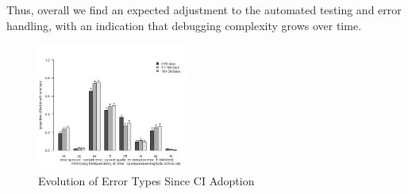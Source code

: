 Thus, overall we find an expected adjustment to the automated testing and 
error handling, with an indication that debugging complexity grows over time.



\begin{figure}[!t]
	\centering
	\includegraphics[width=0.45\textwidth, clip=true, trim=0 15 15 50]{new_plot_together.png}
	\caption{Evolution of Error Types Since CI Adoption}
	\label{Fig:BugTypes}
\end{figure}


